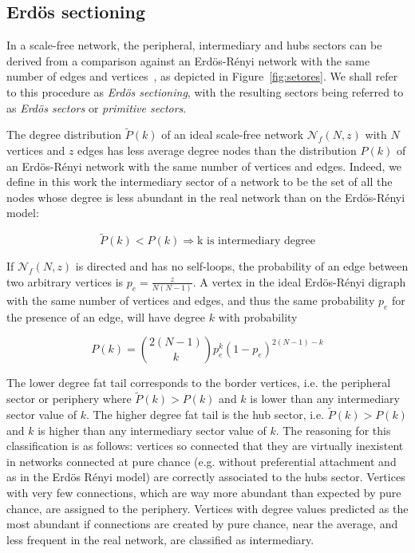 \documentclass[%
	aip,
	jmp,%
	amsmath,amssymb,
	reprint,%
]{revtex4-1}
\begin{document}
\subsection{Erd\"os sectioning}\label{sectioning}
In a scale-free network, the peripheral, intermediary and hubs sectors can be derived from a comparison against an Erd\"os-R\'enyi network with the same number of edges and vertices~\cite{3setores}, as depicted in Figure~\ref{fig:setores}. We shall refer to this procedure as \emph{Erd\"os sectioning}, with the resulting sectors being referred to as \emph{Erd\"os sectors} or \emph{primitive sectors}.

The degree distribution $\widetilde{P}(k)$ of an ideal
scale-free network $\mathcal{N}_f(N,z)$ with $N$ vertices and $z$ edges has less
average degree nodes than the distribution $P(k)$ of an Erd\"os-R\'enyi
network with the same number of vertices and edges. Indeed, we define in this work the intermediary sector of a network to be the set of all the nodes whose degree is less abundant in the real network than on the Erd\"os-R\'enyi model:

\begin{equation}\label{criterio}
	\widetilde{P}(k)<P(k) \Rightarrow \text{k is intermediary degree}
\end{equation}

If $\mathcal{N}_f(N,z)$ is directed and has no self-loops, the probability
of an edge between two arbitrary vertices is $p_e=\frac{z}{N(N-1)}$.
A vertex in the ideal Erd\"os-R\'enyi digraph with the same number of vertices and edges, and thus the same probability $p_e$ for the presence of an edge, will have degree $k$ with probability

\begin{equation}
	P(k)=\binom{2(N-1)}{k}p_e^k(1-p_e)^{2(N-1)-k}
\end{equation}

The lower degree fat tail corresponds to the border vertices, i.e. the peripheral sector or periphery where $\widetilde{P}(k)>P(k)$ and $k$ is lower than any intermediary sector value of $k$. The higher degree fat tail is the hub sector, i.e. $\widetilde{P}(k)>P(k)$ and $k$ is higher than any intermediary sector value of $k$. The reasoning for this classification is as follows: vertices so connected that they are virtually inexistent in networks connected at pure chance (e.g. without preferential attachment and as in the Erd\"os R\'enyi model) are correctly associated to the hubs sector. Vertices with very few connections, which are way more abundant than expected by pure chance, are assigned to the periphery. Vertices with degree values predicted as the most abundant if connections are created by pure chance, near the average, and less frequent in the real network, are classified as intermediary.
\end{document}
